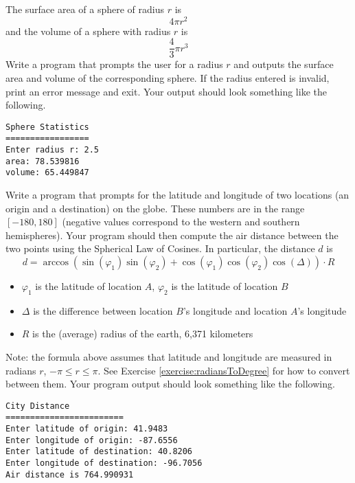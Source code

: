 \begin{exer}
The surface area of a sphere of radius $r$ is
  $$4\pi r^2$$
and the volume of a sphere with radius $r$ is 
  $$\frac{4}{3}\pi r^3$$
Write a program that prompts the user for a radius $r$ and outputs the surface area and volume of 
the corresponding sphere.  If the radius entered is invalid, print an error message and exit.  Your
output should look something like the following.

\begin{verbatim}
Sphere Statistics
=================
Enter radius r: 2.5
area: 78.539816
volume: 65.449847
\end{verbatim}
\end{exer}

\begin{exer}
\label{exercise:basics:airDistance}
Write a program that prompts for the latitude and longitude of two locations (an origin and a 
destination) on the globe.  These numbers are in the range $[-180, 180]$ (negative values 
correspond to the western and southern hemispheres).  Your program should then compute 
the air distance between the two points using the Spherical Law of Cosines.  In particular, 
the distance $d$ is
 $$d = \arccos{(\sin(\varphi_1) \sin(\varphi_2) + \cos(\varphi_1) \cos(\varphi_2) \cos(\Delta) )} \cdot R$$
\begin{itemize}
  \item $\varphi_1$ is the latitude of location $A$, $\varphi_2$ is the latitude of location $B$
  \item $\Delta$ is the difference between location $B$'s longitude and location $A$'s longitude
  \item $R$ is the (average) radius of the earth, 6,371 kilometers
\end{itemize}
Note: the formula above assumes that latitude and longitude are measured in radians $r$, $-\pi \leq r \leq \pi$.  
See Exercise \ref{exercise:radiansToDegree} for how to convert between them.  Your program output should 
look something like the following.  

\begin{verbatim}
City Distance
========================
Enter latitude of origin: 41.9483
Enter longitude of origin: -87.6556
Enter latitude of destination: 40.8206
Enter longitude of destination: -96.7056
Air distance is 764.990931
\end{verbatim}

\end{exer}

